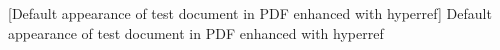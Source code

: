 [Default appearance of test document in PDF enhanced with hyperref]{%
 Default appearance of test document in PDF enhanced with hyperref
}%
